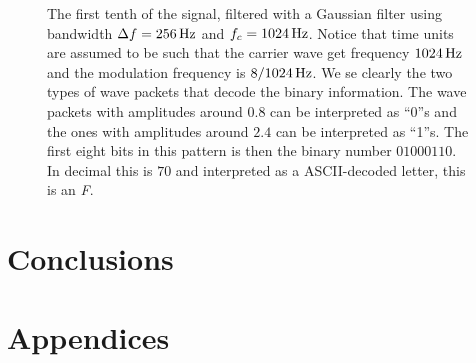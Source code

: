\documentclass[12pt,a4paper]{article}
\begin{document}
\begin{figure}
  \begin{small}
  \centering
  
  \caption{The first tenth of the signal, filtered with a Gaussian
    filter using bandwidth
    $\Delta f = \unit[256]{Hz}$ and $f_c = \unit[1024]{Hz}$.
    Notice that time units are assumed to be such that the carrier wave
    get frequency $\unit[1024]{Hz}$ and the modulation frequency
    is $\unit[8/1024]{Hz}$.
    We se clearly the two types of
    wave packets that decode the binary information.
    The wave packets with amplitudes
    around $0.8$ can be interpreted as ``0''s
    and the ones with amplitudes around $2.4$ can be interpreted as ``1''s.
    The first eight bits in this pattern is then the binary number $01000110$.
    In decimal this is $70$ and interpreted as a
    ASCII-decoded letter, this is an \textit{F}.
  }
  \label{fig:filtered_with_bandwidth_256}
  \end{small}
\end{figure}



\section{Conclusions}


\clearpage
\begin{thebibliography}{99}


\end{thebibliography}

\appendix
\section{Appendices}
\end{document}
